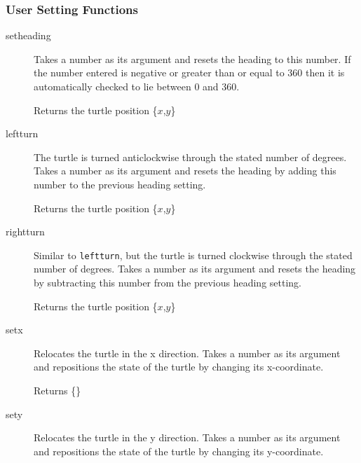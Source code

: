 \subsubsection{User Setting Functions}
\begin{description}
\item[setheading]
  Takes a number as its argument and resets the heading
       to this number. If the number entered is negative or greater than
       or equal to 360 then it is automatically checked to lie between 0
       and 360.

       Returns the turtle position \{$x$,$y$\}


     \item[leftturn]
       The turtle is turned anticlockwise through the
       stated number of degrees. Takes a number as its argument and
       resets the heading by adding this number to the previous heading
       setting.

       Returns the turtle position \{$x$,$y$\}


     \item[rightturn]
       Similar to \texttt{leftturn}, but the turtle is turned
       clockwise through the stated number of degrees. Takes a number as
       its argument and resets the heading by subtracting this number from
       the previous heading setting.

       Returns the turtle position \{$x$,$y$\}


     \item[setx]
       Relocates the turtle in the x direction. Takes a number as
       its argument and repositions the state of the turtle by changing its
       x-coordinate.

       Returns \{\}


     \item[sety]
       Relocates the turtle in the y direction. Takes a number as
       its argument and repositions the state of the turtle by changing its
       y-coordinate.


\end{description}
